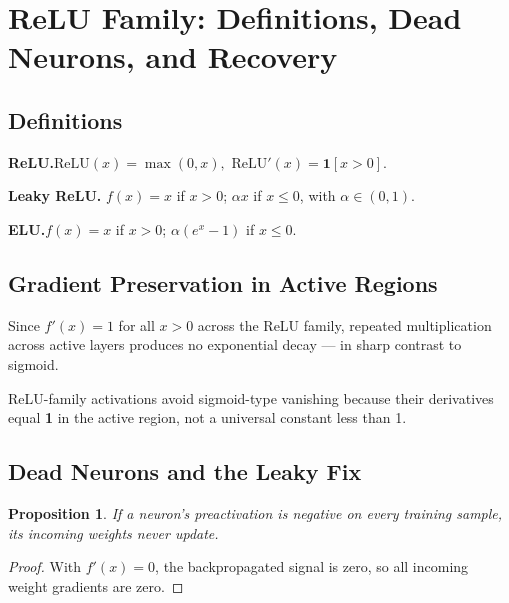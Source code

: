 \documentclass[12pt,a4paper]{article}
\newtheorem{proposition}{Proposition}[section]
\theoremstyle{definition}
\theoremstyle{remark}
\begin{document}
\section{ReLU Family: Definitions, Dead Neurons, and Recovery}

\subsection{Definitions}

\noindent\textbf{ReLU.}\quad $\mathrm{ReLU}(x) = \max(0,x),$ \quad $\mathrm{ReLU}'(x) = \mathbf{1}[x > 0].$

\vspace{4pt}
\noindent\textbf{Leaky ReLU.} \quad $f(x) = x$ if $x>0$; $\alpha x$ if $x\le 0$, with $\alpha \in (0,1)$.

\vspace{4pt}
\noindent\textbf{ELU.}\quad $f(x) = x$ if $x>0$; $\alpha(e^x-1)$ if $x\le 0$.

\subsection{Gradient Preservation in Active Regions}

Since $f'(x) = 1$ for all $x>0$ across the ReLU family, repeated multiplication across active layers produces no exponential decay — in sharp contrast to sigmoid.

\begin{keybox}
ReLU-family activations avoid sigmoid-type vanishing because their derivatives equal \textbf{1} in the active region, not a universal constant less than 1.
\end{keybox}

\subsection{Dead Neurons and the Leaky Fix}

\begin{proposition}
If a neuron's preactivation is negative on every training sample, its incoming weights never update.
\end{proposition}

\begin{proof}
With $f'(x)=0$, the backpropagated signal is zero, so all incoming weight gradients are zero.
\end{proof}
\end{document}

